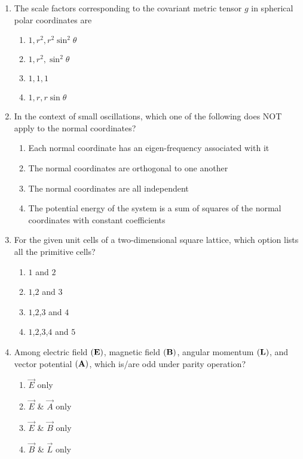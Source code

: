 \documentclass[journal,12pt,twocolumn]{IEEEtran}
\theoremstyle{remark}
\begin{document}
\begin{enumerate}[start=1]
\item The scale factors corresponding to the covariant metric tensor $g$ in spherical polar coordinates are
\begin{enumerate}
    \item $1, r^2, r^2 \sin^2 \theta$
    \item $1, r^2, \sin^2 \theta$
    \item $1, 1, 1$
    \item $1, r, r \sin \theta$
\end{enumerate}

\item In the context of small oscillations, which one of the following does NOT apply to the normal coordinates?
\begin{enumerate}
    \item Each normal coordinate has an eigen-frequency associated with it
    \item The normal coordinates are orthogonal to one another
    \item The normal coordinates are all independent
    \item The potential energy of the system is a sum of squares of the normal coordinates with constant coefficients
\end{enumerate}

\item For the given unit cells of a two-dimensional square lattice, which option lists all the primitive cells?\\

\begin{enumerate}
    \item $1$ and $2$
    \item $1$,$2$ and $3$
  \item $1$,$2$,$3$ and $4$
   \item  $1$,$2$,$3$,$4$ and $5$
\end{enumerate}

\item Among electric field $\left(\mathbf{E}\right)$, magnetic field $\left(\mathbf{B}\right)$, angular momentum $\left(\mathbf{L}\right)$, and vector potential $\left(\mathbf{A}\right)$, which is/are odd under parity  operation?
\begin{enumerate}
    \item $\vec{E}$ only
    \item $\vec{E}$ \& $\vec{A}$ only
    \item $\vec{E}$ \& $\vec{B}$ only
    \item $\vec{B}$ \& $\vec{L}$ only
\end{enumerate}


\end{enumerate}
\end{document}
